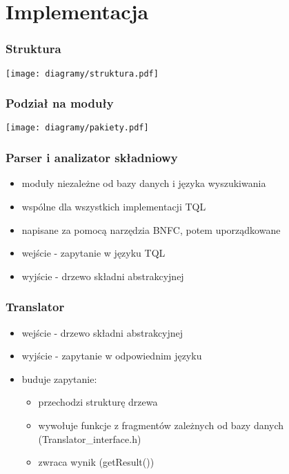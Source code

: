 \section{Implementacja}
\begin{frame}
     \frametitle{Struktura}
\begin{center}
\texttt{[image: diagramy/struktura.pdf]}
\end{center}
\end{frame}


\begin{frame}
     \frametitle{Podział na moduły}
    
\begin{center}
\texttt{[image: diagramy/pakiety.pdf]}
\end{center}
\end{frame}

\begin{frame}
\frametitle{Parser i analizator składniowy}
\begin{itemize}
\item moduły niezależne od bazy danych i języka wyszukiwania
\item wspólne dla wszystkich  implementacji TQL
\item napisane za pomocą narzędzia BNFC, potem uporządkowane
\item wejście - zapytanie w języku TQL
\item wyjście - drzewo składni abstrakcyjnej
\end{itemize}
\end{frame}

\begin{frame}
\frametitle{Translator}
\begin{itemize}
\item wejście - drzewo składni abstrakcyjnej
\item wyjście - zapytanie w odpowiednim języku
\item buduje zapytanie:
\begin{itemize}
 \item przechodzi strukturę drzewa
 \item wywołuje funkcje z fragmentów zależnych od bazy danych (Translator\_interface.h)
 \item zwraca wynik (getResult())
\end{itemize}
\end{itemize}
\end{frame}


